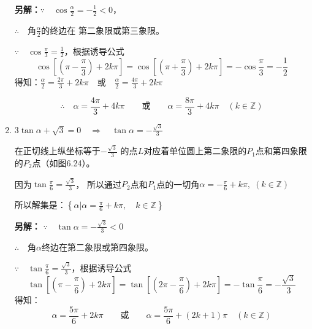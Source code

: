 \begin{solution}
\begin{enumerate}
\textbf{另解：}$\because\quad \cos\frac{\alpha}{2}=-\frac{1}{2}<0$，

$\therefore\quad $角$\frac{\alpha}{2}$的终边在
第二象限或第三象限。

$\because\quad \cos\frac{\pi}{3}=\frac{1}{2}$，根据诱导公式
\[\cos\left[\left(\pi-\frac{\pi}{3}\right)+2k\pi\right]=\cos\left[\left(\pi+\frac{\pi}{3}\right)+2k\pi\right]=-\cos\frac{\pi}{3}=-\frac{1}{2}\]
得知：$\frac{\alpha}{2}=\frac{2\pi}{3}+2k\pi\quad \text{或}\quad \frac{\alpha}{2}=\frac{4\pi}{3}+2k\pi$

\[\therefore\quad \alpha=\frac{4\pi}{3}+4k\pi\qquad \text{或}\qquad  \alpha =\frac{8\pi}{3}+4k\pi\quad  (k\in\mathbb{Z})\]

\item $3\tan\alpha+\sqrt{3}=0\quad \Rightarrow\quad \tan\alpha=-\frac{\sqrt{3}}{3}$

在正切线上纵坐标等于$-\frac{\sqrt{3}}{3}$
的点$L$对应着单位圆上第二象限的$P_1$点和第四象限的$P_2$点（如图6.24）。
\begin{figure}[htp]
    \centering
{}
    \caption{}
\end{figure}

因为$\tan\frac{\pi}{6}=\frac{\sqrt{3}}{3}$，
所以通过$P_2$点和$P_1$点的一切角$\alpha=-\frac{\pi}{6}+k\pi,\; (k\in\mathbb{Z})$

所以解集是：$\left\{\alpha\Big|\alpha=\frac{\pi}{6}+k\pi,\quad k\in\mathbb{Z}\right\}$

\textbf{另解：} $\because\quad \tan\alpha=-\frac{\sqrt{3}}{3}<0$

$\therefore\quad $角$\alpha$终边在第二象限或第四象限。

$\because\quad \tan\frac{\pi}{6}=\frac{\sqrt{3}}{3}$，根据诱导公式
\[\tan\left[\left(\pi-\frac{\pi}{6}\right)+2k\pi\right]=\tan\left[\left(2\pi-\frac{\pi}{6}\right)+2k\pi\right]=-\tan\frac{\pi}{6}=-\frac{\sqrt{3}}{3}\]
得知：
\[\alpha=\frac{5\pi}{6}+2k\pi\qquad \text{或}\qquad \alpha=\frac{5\pi}{6}+(2k+1)\pi\quad (k\in\mathbb{Z})\]
\end{enumerate}
\end{solution}

